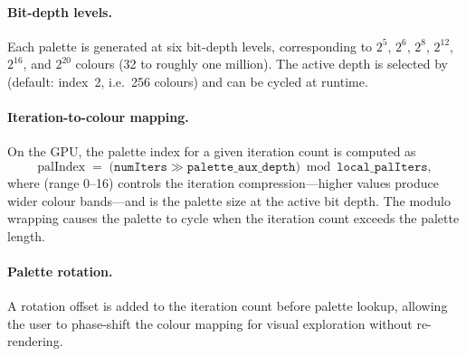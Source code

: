 \paragraph{Bit-depth levels.}
Each palette is generated at six bit-depth levels, corresponding to
$2^5$, $2^6$, $2^8$, $2^{12}$, $2^{16}$, and $2^{20}$ colours
(32 to roughly one million).  The active depth is selected by
 (default: index~2, i.e.\ 256 colours)
and can be cycled at runtime.

\paragraph{Iteration-to-colour mapping.}
On the GPU, the palette index for a given iteration count is computed
as
\[
  \mathrm{palIndex} \;=\;
  \bigl(\mathtt{numIters} \gg \mathtt{palette\_aux\_depth}\bigr)
    \bmod \mathtt{local\_palIters},
\]
where  (range 0--16) controls the iteration
compression---higher values produce wider colour bands---and
 is the palette size at the active bit depth.
The modulo wrapping causes the palette to cycle when the iteration
count exceeds the palette length.

\paragraph{Palette rotation.}
A rotation offset  is added to the iteration
count before palette lookup, allowing the user to phase-shift the
colour mapping for visual exploration without re-rendering.

